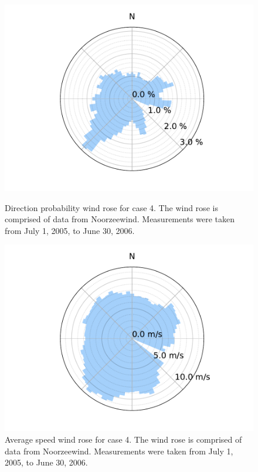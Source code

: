 \documentclass[hidelinks,sort&compress,AMA,STIX1COL]{WileyNJD-v2}
\providecommand{\DIFaddbeginFL}{} %
\providecommand{\DIFaddendFL}{} %
\providecommand{\DIFdelbeginFL}{} %
\providecommand{\DIFdelendFL}{} %
\newcommand{\DIFscaledelfig}{0.5}
\newlength{\DIFdelgraphicswidth} %
\newlength{\DIFdelgraphicsheight} %
\newcommand{\DIFaddincludegraphics}[2][]{{\color{blue}\fbox{\DIFOincludegraphics[#1]{#2}}}} %
\newcommand{\DIFdelincludegraphics}[2][]{%
\sbox{\DIFdelgraphicsbox}{\DIFOincludegraphics[#1]{#2}}%
\settoboxwidth{\DIFdelgraphicswidth}{\DIFdelgraphicsbox} %
\settoboxtotalheight{\DIFdelgraphicsheight}{\DIFdelgraphicsbox} %
\scalebox{\DIFscaledelfig}{%
\parbox[b]{\DIFdelgraphicswidth}{\usebox{\DIFdelgraphicsbox}\\[-\baselineskip] \rule{\DIFdelgraphicswidth}{0em}}\llap{\resizebox{\DIFdelgraphicswidth}{\DIFdelgraphicsheight}{%
\setlength{\unitlength}{\DIFdelgraphicswidth}%
\begin{picture}(1,1)%
\thicklines\linethickness{2pt} %
{\color[rgb]{1,0,0}\put(0,0){\framebox(1,1){}}}%
{\color[rgb]{1,0,0}\put(0,0){\line( 1,1){1}}}%
{\color[rgb]{1,0,0}\put(0,1){\line(1,-1){1}}}%
\end{picture}%
}\hspace*{3pt}}} %
} %
\DeclareRobustCommand{\DIFaddbeginFL}{\DIFOaddbeginFL \let\includegraphics\DIFaddincludegraphics} %
\DeclareRobustCommand{\DIFaddendFL}{\DIFOaddendFL \let\includegraphics\DIFOincludegraphics} %
\DeclareRobustCommand{\DIFdelbeginFL}{\DIFOdelbeginFL \let\includegraphics\DIFdelincludegraphics} %
\DeclareRobustCommand{\DIFdelendFL}{\DIFOaddendFL \let\includegraphics\DIFOincludegraphics} %
\begin{document}
\begin{figure}[h!]
	\centering
	\begin{minipage}[t]{18pc}
		\centering
		\DIFdelbeginFL %
\DIFdelendFL \DIFaddbeginFL \includegraphics[width=\textwidth, trim={1.5cm 0cm 1.5cm 0cm}, clip]{final_images/windroses/Figure_15.pdf}
		\DIFaddendFL \caption{Direction probability wind rose for case 4. The wind rose is comprised of data from Noorzeewind\cite{noordzeewind2006}. Measurements were taken from July 1, 2005, to June 30, 2006.}
		\label{fig:freqwindrose_72dir}
	\end{minipage} \hspace{1pc}%
	\begin{minipage}[t]{18pc}
		\centering
		\DIFdelbeginFL %
\DIFdelendFL \DIFaddbeginFL \includegraphics[width=1.\textwidth, trim={1.5cm, 0cm, 1.5cm, 0cm}, clip]{final_images/windroses/Figure_16.pdf}
		\DIFaddendFL \caption{Average speed wind rose for case 4. The wind rose is comprised of data from Noorzeewind\cite{noordzeewind2006}. Measurements were taken from July 1, 2005, to June 30, 2006.}
		\label{fig:speedwindrose_72dir}
	\end{minipage}
\end{figure}
\end{document}
